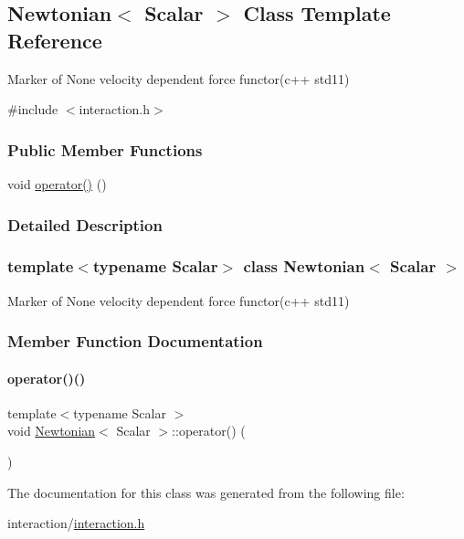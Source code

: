 \hypertarget{class_newtonian}{}\subsection{Newtonian$<$ Scalar $>$ Class Template Reference}
\label{class_newtonian}


Marker of None velocity dependent force functor(c++ std11)  




{\ttfamily \#include $<$interaction.\+h$>$}

\subsubsection*{Public Member Functions}
\begin{DoxyCompactItemize}
\item 
void \mbox{\hyperlink{class_newtonian_a13f6ce2d08ba777301542e001eab5f9b}{operator()}} ()
\end{DoxyCompactItemize}


\subsubsection{Detailed Description}
\subsubsection*{template$<$typename Scalar$>$\newline
class Newtonian$<$ Scalar $>$}

Marker of None velocity dependent force functor(c++ std11) 

\subsubsection{Member Function Documentation}
\mbox{\label{class_newtonian_a13f6ce2d08ba777301542e001eab5f9b}} 
\paragraph{\texorpdfstring{operator()()}{operator()()}}
{\footnotesize\ttfamily template$<$typename Scalar $>$ \\
void \mbox{\hyperlink{class_newtonian}{Newtonian}}$<$ Scalar $>$\+::operator() (\begin{DoxyParamCaption}{ }\end{DoxyParamCaption})\hspace{0.3cm}{\ttfamily [inline]}}



The documentation for this class was generated from the following file\+:\begin{DoxyCompactItemize}
\item 
interaction/\mbox{\hyperlink{interaction_8h}{interaction.\+h}}\end{DoxyCompactItemize}
